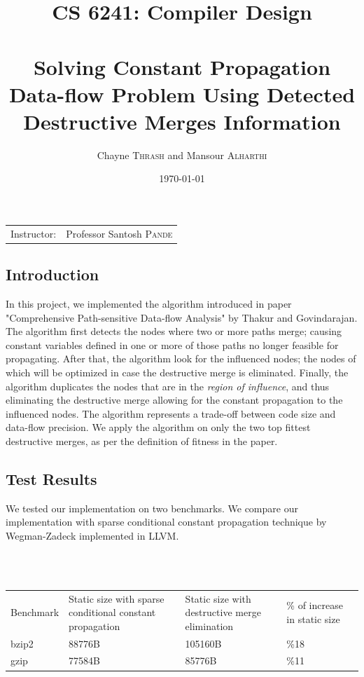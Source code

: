 \documentclass{article}
\title{CS 6241: Compiler Design \\~\\ Solving Constant Propagation Data-flow Problem Using Detected Destructive Merges Information} %
\author{Chayne \textsc{Thrash} and Mansour \textsc{Alharthi}} %
\date{\today} %
\begin{document}
\maketitle %

\begin{center}
\begin{tabular}{l r}
Instructor: & Professor Santosh \textsc{Pande} %
\end{tabular}
\end{center}

\subsection{Introduction}
In this project, we implemented the algorithm introduced in paper "Comprehensive Path-sensitive Data-flow Analysis" by Thakur and Govindarajan. The algorithm first detects the nodes where two or more paths merge; causing constant variables defined in one or more of those paths no longer feasible for propagating. After that, the algorithm look for the influenced nodes; the nodes of which will be optimized in case the destructive merge is eliminated. Finally, the algorithm duplicates the nodes that are in the \textit{region of influence}, and thus eliminating the destructive merge allowing for the constant propagation to the influenced nodes. The algorithm represents a trade-off between code size and data-flow precision. We apply the algorithm on only the two top fittest destructive merges, as per the definition of fitness in the paper. 

\subsection{Test Results}
We tested our implementation on two benchmarks. We compare our implementation with sparse conditional constant propagation technique by Wegman-Zadeck implemented in LLVM. 

~\\~

\begin{adjustbox}{center}
\renewcommand{\arraystretch}{2}
\begin{tabular}{| C{3cm} | C{3cm} | C{3cm} | C{3cm} | C{3cm} |}
\hline
Benchmark & Static size with sparse conditional constant propagation & Static size with destructive merge elimination & \% of increase in static size \\  
bzip2 & 88776B & 105160B & \%18  \\ 
gzip & 77584B & 85776B & \%11  \\ 
\end{tabular}
\end{adjustbox}
\end{document}
